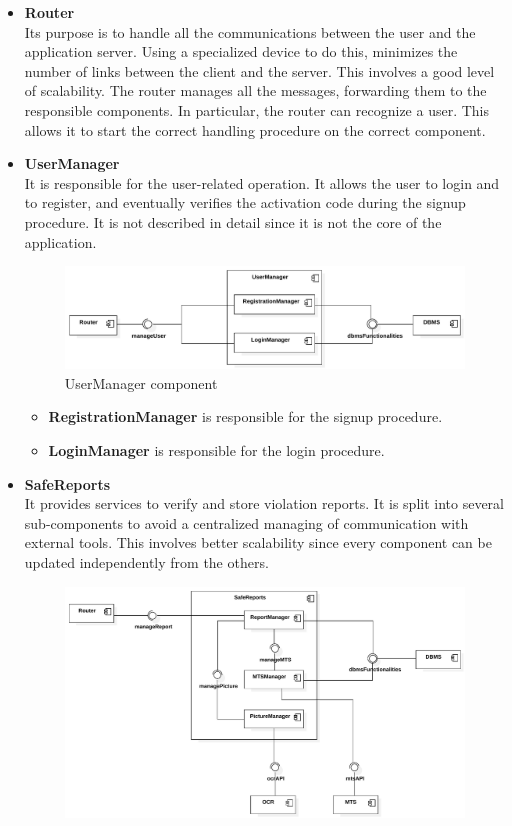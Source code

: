 \documentclass[./main.tex]{subfiles}
\begin{document}
\begin{itemize}
\item
  \textbf{Router}\\
  Its purpose is to handle all the communications between the user and the
  application server. Using a specialized device to do this, minimizes the
  number of links between the client and the server. This involves a good level
  of scalability. The router manages all the messages, forwarding them to the
  responsible components. In particular, the router can recognize a user. This
  allows it to start the correct handling procedure on the correct component.
\item
  \textbf{UserManager}\\
  It is responsible for the user-related operation. It allows the user to login
  and to register, and eventually verifies the activation code during the
  signup procedure. It is not described in detail since it is not the core of
  the application.
  \begin{figure}[H]
  \centering
  \includegraphics[width=\textwidth]{resources/component_diagram/component_diagram_user_manager}
  \caption{UserManager component}
  \end{figure}
  \begin{itemize}
  \item
    \textbf{RegistrationManager} is responsible for the signup procedure.
  \item
    \textbf{LoginManager} is responsible for the login procedure.
  \end{itemize}
\item
  \textbf{SafeReports}\\
  It provides services to verify and store violation reports. It is split into
  several sub-components to avoid a centralized managing of communication with
  external tools. This involves better scalability since every component can be
  updated independently from the others.
  \begin{figure}[H]
  \centering
  \includegraphics[width=\textwidth]{resources/component_diagram/component_diagram_safe_reports}

\end{figure}
\end{itemize}
\end{document}
